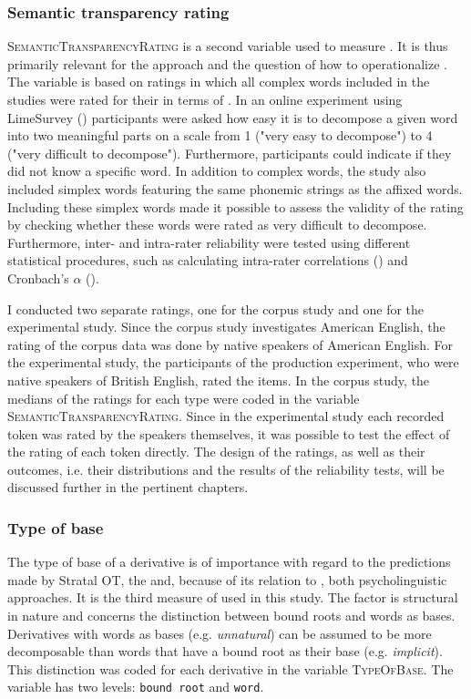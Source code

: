 \subsubsection{Semantic transparency rating} \textsc{SemanticTransparencyRating} is a second variable used to measure . It is thus primarily relevant for the  approach and the question of how to operationalize .  
 The variable is based on ratings in which all complex words included in the studies were rated for their  in terms of .
  In an online experiment using LimeSurvey (\citealt{LimeSurveyProjectTeam.2015}) participants  were asked how easy it is to decompose a given word into two meaningful parts on a scale from 1 ("very easy to decompose") to 4 ("very difficult to decompose"). Furthermore, participants could indicate if they did not know a specific word. In addition to complex words, the study also included simplex words featuring the same phonemic strings as the affixed words. Including these simplex words made it possible to assess the validity of the rating by checking whether these words were rated as very difficult to decompose. Furthermore, inter- and intra-rater reliability were tested using different statistical procedures, such as calculating intra-rater correlations (\citealt{Bartko.1966}) and Cronbach's $\alpha$ (\citealt{Cronbach.1951}). 

I conducted two separate ratings, one for the corpus study and one for the experimental study. Since the corpus study investigates American English, the rating of the corpus data was done by native speakers of American English. For the experimental study, the participants of the production experiment, who were native speakers of British English, rated the items. 
In the corpus study, the medians of the ratings for each type were coded in the variable \textsc{SemanticTransparencyRating}. Since in the experimental study each recorded token was rated by the speakers themselves, it was possible to test the effect of the rating of each token directly.
The design of the ratings, as well as their outcomes, i.e. their distributions and the results of the reliability tests, will be discussed further in the pertinent chapters.


\subsubsection{Type of base} 
The type of base of a derivative is of importance with regard to the predictions made by Stratal OT, the  and, because of its relation to , both psycholinguistic approaches. It is
the third measure of  used in this study. The factor is structural in nature and concerns the distinction between bound roots and words as bases. Derivatives with words as bases  (e.g. \textit{unnatural}) can be assumed to be more decomposable than words that have a bound root as their base  (e.g. \textit{implicit}). This distinction was coded for each derivative in the variable \textsc{TypeOfBase}. The variable has two levels: \texttt{bound root} and \texttt{word}.


